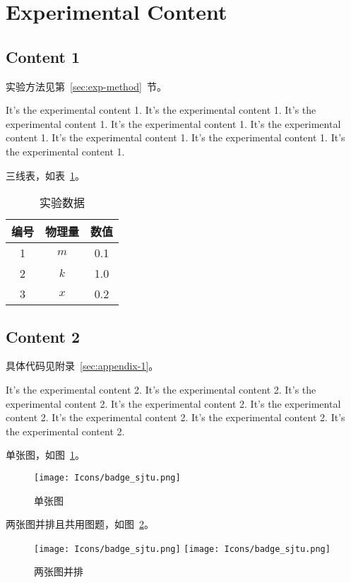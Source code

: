 \section{Experimental Content}

\subsection{Content 1}

实验方法见第~\ref{sec:exp-method}~节。

It's the experimental content 1. It's the experimental content 1. It's the experimental content 1. It's the experimental content 1. 
It's the experimental content 1. It's the experimental content 1. It's the experimental content 1. It's the experimental content 1. 


三线表，如表~\ref{tab:exp-data}。

\begin{longtable}[c]{ccc}
    \caption{实验数据}
    \label{tab:exp-data} \\
    \toprule
    \textbf{编号} & \textbf{物理量} & \textbf{数值} \\
    \midrule
    \endhead
    1 & $m$ & 0.1 \\
    2 & $k$ & 1.0 \\
    3 & $x$ & 0.2 \\
    \bottomrule
\end{longtable}



\subsection{Content 2}

具体代码见附录~\ref{sec:appendix-1}。

It's the experimental content 2. It's the experimental content 2. It's the experimental content 2. It's the experimental content 2. 
It's the experimental content 2. It's the experimental content 2. It's the experimental content 2. It's the experimental content 2. 

单张图，如图~\ref{fig:single-figure}。
\begin{figure}[!htp]
    \centering
    \texttt{[image: Icons/badge\_sjtu.png]}
    \caption{单张图}
    \label{fig:single-figure}
\end{figure}


两张图并排且共用图题，如图~\ref{fig:two-figures}。
\begin{figure}[!htp]
    \centering
    \texttt{[image: Icons/badge\_sjtu.png]}
    \hspace{1cm}
    \texttt{[image: Icons/badge\_sjtu.png]}
    \caption{两张图并排}
    \label{fig:two-figures}
\end{figure}


